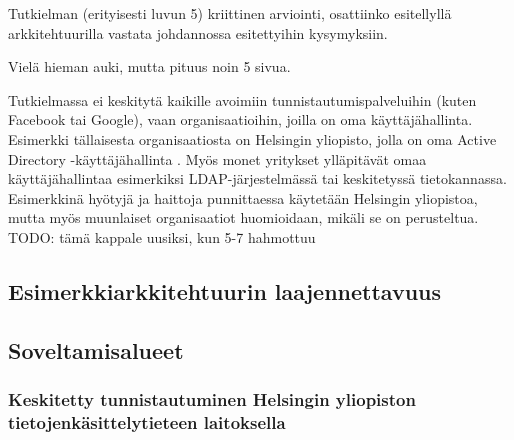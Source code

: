 Tutkielman (erityisesti luvun 5) kriittinen arviointi, osattiinko esitellyllä arkkitehtuurilla vastata johdannossa esitettyihin kysymyksiin.

Vielä hieman auki, mutta pituus noin 5 sivua.

Tutkielmassa ei keskitytä kaikille avoimiin tunnistautumispalveluihin (kuten Facebook tai Google), vaan organisaatioihin, joilla on oma käyttäjähallinta. Esimerkki tällaisesta organisaatiosta on Helsingin yliopisto, jolla on oma Active Directory -käyttäjähallinta \cite{tietotekniikkaa}. Myös monet yritykset ylläpitävät omaa käyttäjähallintaa esimerkiksi LDAP-järjestelmässä tai keskitetyssä tietokannassa. Esimerkkinä hyötyjä ja haittoja punnittaessa käytetään Helsingin yliopistoa, mutta myös muunlaiset organisaatiot huomioidaan, mikäli se on perusteltua. TODO: tämä kappale uusiksi, kun 5-7 hahmottuu

\subsection{Esimerkkiarkkitehtuurin laajennettavuus}


\subsection{Soveltamisalueet}

\subsubsection{Keskitetty tunnistautuminen Helsingin yliopiston tietojenkäsittelytieteen laitoksella}
